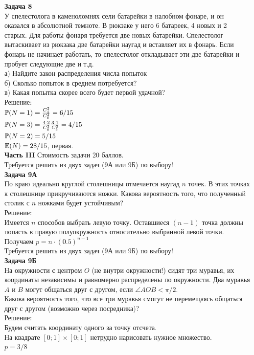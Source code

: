 \documentclass[12pt, a4paper]{article}\usepackage[]{graphicx}\usepackage[]{color}
\begin{document}
	\textbf{Задача 8} \\ %
	У спелестолога в каменоломнях сели батарейки в налобном фонаре, и он оказался в абсолютной темноте. В рюкзаке у него 6 батареек, 4 новых и 2 старых. Для работы фонаря требуется две новых батарейки. Спелестолог вытаскивает из рюкзака две батарейки наугад и вставляет их в фонарь. Если фонарь не начинает работать, то спелестолог откладывает эти две батарейки и пробует следующие две и т.д. \\
	а) Найдите закон распределения числа попыток \\
	б) Сколько попыток в среднем потребуется? \\
	в) Какая попытка скорее всего будет первой удачной? \\
	Решение: \\
	$\P(N=1)=\frac{C_{4}^{2}}{C_{6}^{2}}=6/15$ \\
	$\P(N=3)=\frac{4\cdot 2}{C_{6}^{2}}\frac{3\cdot 1}{C_{5}^{2}}=4/15$\\
	$\P(N=2)=5/15$ \\
	$\E(N)=28/15$, первая. \\


	\textbf{Часть III} Стоимость задачи 20 баллов. \\

	Требуется решить \textbf{} из двух задач (9А или 9Б) по
	выбору! \\

	\textbf{Задача 9А} \\
	По краю идеально круглой столешницы отмечается наугад $n$ точек. В этих точках к столешнице прикручиваются ножки. Какова вероятность того, что полученный столик с $n$ ножками будет устойчивым? \\
	Решение: \\
	Имеется $n$ способов выбрать левую точку. Оставшиеся $(n-1)$ точка должны попасть в правую полуокружность относительно выбранной левой точки.\\
	Получаем $p=n\cdot (0.5)^{n-1}$ \\


	Требуется решить \textbf{} из двух задач (9А или 9Б) по
	выбору! \\

	\textbf{Задача 9Б} \\
	На окружности  с центром $O$ (не внутри окружности!) сидят три муравья, их
	координаты независимы и равномерно распределены по окружности. Два
	муравья $A$ и $B$ могут общаться друг с другом, если $\angle AOB<\pi/2$. \\
	Какова вероятность того, что все три муравья смогут не перемещаясь
	общаться друг с другом (возможно через посредника)? \\
	Решение: \\
	Будем считать координату одного за точку отсчета. \\
	На квадрате $[0;1]\times[0;1]$ нетрудно нарисовать нужное множество. \\
	$p=3/8$ \\
\end{document}

